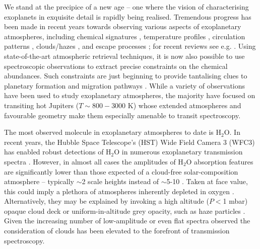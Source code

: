 \documentclass[fleqn,usenatbib]{mnras}
\begin{document}
We stand at the precipice of a new age -- one where the vision of characterising exoplanets in exquisite detail is rapidly being realised. Tremendous progress has been made in recent years towards observing various aspects of exoplanetary atmospheres, including chemical signatures \citep{Snellen2010,Deming2013}, temperature profiles \citep{Haynes2015,Line2016b}, circulation patterns \citep{Stevenson2014}, clouds/hazes \citep{Sing2016}, and escape processes \citep{Ehrenreich2015}; for recent reviews see e.g. \citet{Madhusudhan2014a, Crossfield2015, Madhusudhan2016a}. Using state-of-the-art atmospheric retrieval techniques, it is now also possible to use spectroscopic observations to extract precise constraints on the chemical abundances. Such constraints are just beginning to provide tantalising clues to planetary formation and migration pathways \citep[e.g.][]{Oberg2011, Madhusudhan2014b, Mordasini2016}. While a variety of observations have been used to study exoplanetary atmospheres, the majority have focused on transiting hot Jupiters ($T\sim 800-3000$ K) whose extended atmospheres and favourable geometry make them especially amenable to transit spectroscopy. 

The most observed molecule in exoplanetary atmospheres to date is H$_2$O. In recent years, the Hubble Space Telescope's (HST) Wide Field Camera 3 (WFC3) has enabled robust detections of H$_2$O in numerous exoplanetary transmission spectra \citep[e.g.][]{Deming2013}. However, in almost all cases the amplitudes of H$_2$O absorption features are significantly lower than those expected of a cloud-free solar-composition atmosphere -- typically $\sim$2 scale heights \citep{Deming2013,Kreidberg2015,Sing2016} instead of $\sim$5-10 \citep{Madhusudhan2014a}. Taken at face value, this could imply a plethora of atmospheres inherently depleted in oxygen \citep{Madhusudhan2014c}. Alternatively, they may be explained by invoking a high altitude ($P<$1 mbar) opaque cloud deck \citep{Deming2013} or uniform-in-altitude grey opacity, such as haze particles \citep{Pont2013}. Given the increasing number of low-amplitude or even flat spectra observed \citep[e.g][]{Kreidberg2014a, Knutson2014b, Knutson2014c, Ehrenreich2014a, Sing2016} the consideration of clouds has been elevated to the forefront of transmission spectroscopy.
\end{document}
